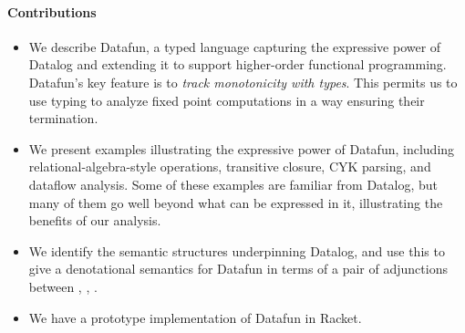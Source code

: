 \paragraph{Contributions}
\begin{itemize}
\item We describe Datafun, a typed language capturing the expressive power of
  Datalog and extending it to support higher-order functional programming.
  Datafun's key feature is to \emph{track monotonicity with types}. This permits
  us to use typing to analyze fixed point computations in a way ensuring their
  termination.

\item We present examples illustrating the expressive power of Datafun,
  including relational-algebra-style operations, transitive closure, CYK
  parsing, and dataflow analysis. Some of these examples are familiar from
  Datalog, but many of them go well beyond what can be expressed in it,
  illustrating the benefits of our analysis.

\item We identify the semantic structures underpinning Datalog, and use this to
  give a denotational semantics for Datafun in terms of a pair of adjunctions
  between \cSet{}, \cPoset{}, \cSL{}.

\item We have a prototype implementation of Datafun in Racket. 
\end{itemize}







